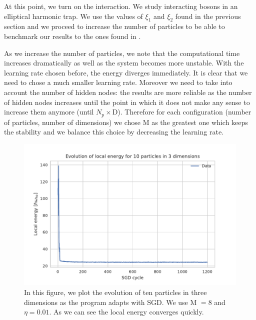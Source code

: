 At this point, we turn on the interaction. We study interacting bosons in an elliptical harmonic trap. We use the values of $\xi_1$ and $\xi_2$ found in the previous section and we proceed to increase the number of particles to be able to benchmark our results to the ones found in \cite{DalfString}.
 
As we increase the number of particles, we note that the computational time increases dramatically as well as the system becomes more unstable. With the learning rate chosen before, the energy diverges immediately. It is clear that we need to chose a much smaller learning rate. Moreover we need to take into account the number of hidden nodes: the results are more reliable as the number of hidden nodes increases until the point in which it does not make any sense to increase them anymore (until $N_p\times $D). Therefore for each configuration (number of particles, number of dimensions) we chose M as the greatest one which keeps the stability and we balance this choice by decreasing the learning rate.

\begin{figure}[H]
		\centering
		\includegraphics[scale=1.0]{plot_final10.pdf}
	\caption{In this figure, we plot the evolution of ten particles in three dimensions as the program adapts with SGD. We use M $=8$ and $\eta=0.01$. As we can see the local energy converges quickly.}
	\label{Fig:7_8}
\end{figure}

